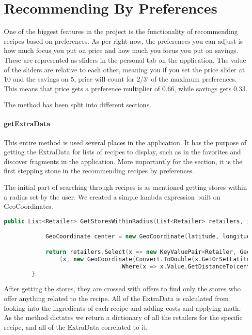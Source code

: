\section{Recommending By Preferences}
\label{sec:searchbypref}

One of the biggest features in the project is the functionality of recommending recipes based on preferences. As per right now, the preferences you can adjust is how much focus you put on price and how much you focus you put on savings. These are represented as sliders in the personal tab on the application. The value of the sliders are relative to each other, meaning you if you set the price slider at 10 and the savings on 5, price will count for 2/3' of the maximum preferences. This means that price gets a preference multiplier of 0.66, while savings gets 0.33.

The method has been split into different sections.

\paragraph{getExtraData} This entire method is used several places in the application. It has the purpose of getting the ExtraData for lists of recipes to display, such as in the favorites and discover fragments in the application. More importantly for the section, it is the first stepping stone in the recommending recipes by preferences.

The initial part of searching through recipes is as mentioned getting stores within a radius set by the user. We created a simple lambda expression built on GeoCoordinates.

\begin{lstlisting}[language=c++]
 public List<Retailer> GetStoresWithinRadius(List<Retailer> retailers, int radius, double latitude, double longitude) {

            GeoCoordinate center = new GeoCoordinate(latitude, longitude);

            return retailers.Select(x => new KeyValuePair<Retailer, GeoCoordinate>
				(x, new GeoCoordinate(Convert.ToDouble(x.GetOrSetLatitude), Convert.ToDouble(x.GetOrSetLongitude))))
                                 .Where(x => x.Value.GetDistanceTo(center) < radius).ToDictionary(x => x.Key, x => x.Value).Keys.ToList();
        }
\end{lstlisting}

After getting the stores, they are crossed with offers to find only the stores who offer anything related to the recipe. All of the ExtraData is calculated from looking into the ingredients of each recipe and adding costs and applying math. As the method dictates we return a dictionary of all the retailers for the specific recipe, and all of the ExtraData correlated to it.

